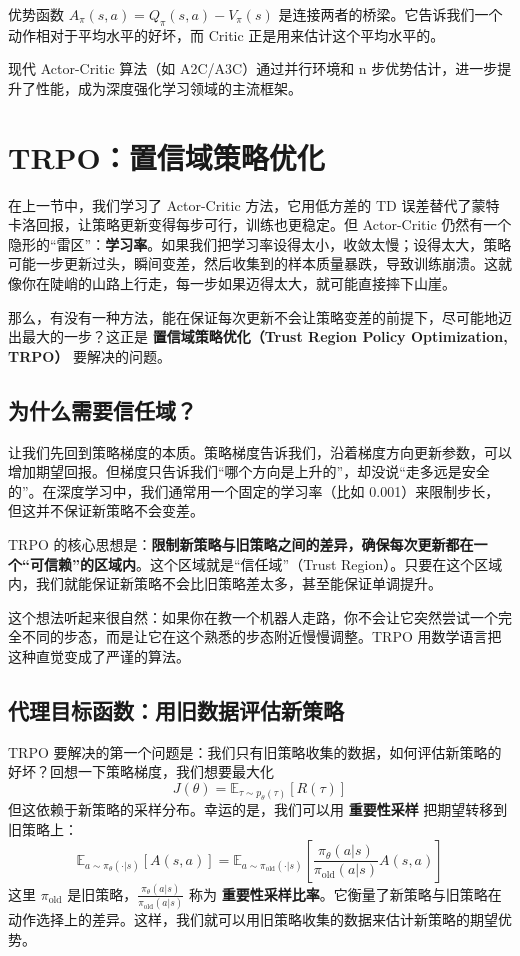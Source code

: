 \documentclass[lang=cn,zihao=-4,a4paper,fontset=windows]{beautybook}
\begin{document}
优势函数 \(A_\pi(s,a) = Q_\pi(s,a) - V_\pi(s)\) 是连接两者的桥梁。它告诉我们一个动作相对于平均水平的好坏，而 Critic 正是用来估计这个平均水平的。

现代 Actor-Critic 算法（如 A2C/A3C）通过并行环境和 n 步优势估计，进一步提升了性能，成为深度强化学习领域的主流框架。



\section{TRPO：置信域策略优化}

在上一节中，我们学习了 Actor-Critic 方法，它用低方差的 TD 误差替代了蒙特卡洛回报，让策略更新变得每步可行，训练也更稳定。但 Actor-Critic 仍然有一个隐形的“雷区”：\textbf{学习率}。如果我们把学习率设得太小，收敛太慢；设得太大，策略可能一步更新过头，瞬间变差，然后收集到的样本质量暴跌，导致训练崩溃。这就像你在陡峭的山路上行走，每一步如果迈得太大，就可能直接摔下山崖。

那么，有没有一种方法，能在保证每次更新不会让策略变差的前提下，尽可能地迈出最大的一步？这正是 \textbf{置信域策略优化（Trust Region Policy Optimization, TRPO）} 要解决的问题。

\subsection{为什么需要信任域？}

让我们先回到策略梯度的本质。策略梯度告诉我们，沿着梯度方向更新参数，可以增加期望回报。但梯度只告诉我们“哪个方向是上升的”，却没说“走多远是安全的”。在深度学习中，我们通常用一个固定的学习率（比如 0.001）来限制步长，但这并不保证新策略不会变差。

TRPO 的核心思想是：\textbf{限制新策略与旧策略之间的差异，确保每次更新都在一个“可信赖”的区域内}。这个区域就是“信任域”（Trust Region）。只要在这个区域内，我们就能保证新策略不会比旧策略差太多，甚至能保证单调提升。

这个想法听起来很自然：如果你在教一个机器人走路，你不会让它突然尝试一个完全不同的步态，而是让它在这个熟悉的步态附近慢慢调整。TRPO 用数学语言把这种直觉变成了严谨的算法。

\subsection{代理目标函数：用旧数据评估新策略}

TRPO 要解决的第一个问题是：我们只有旧策略收集的数据，如何评估新策略的好坏？回想一下策略梯度，我们想要最大化
\[
J(\theta) = \mathbb{E}_{\tau \sim p_\theta(\tau)}[R(\tau)]
\]
但这依赖于新策略的采样分布。幸运的是，我们可以用 \textbf{重要性采样} 把期望转移到旧策略上：
\[
\mathbb{E}_{a \sim \pi_\theta(\cdot|s)} [A(s,a)] = \mathbb{E}_{a \sim \pi_{\text{old}}(\cdot|s)} \left[ \frac{\pi_\theta(a|s)}{\pi_{\text{old}}(a|s)} A(s,a) \right]
\]
这里 \(\pi_{\text{old}}\) 是旧策略，\(\frac{\pi_\theta(a|s)}{\pi_{\text{old}}(a|s)}\) 称为 \textbf{重要性采样比率}。它衡量了新策略与旧策略在动作选择上的差异。这样，我们就可以用旧策略收集的数据来估计新策略的期望优势。
\end{document}
